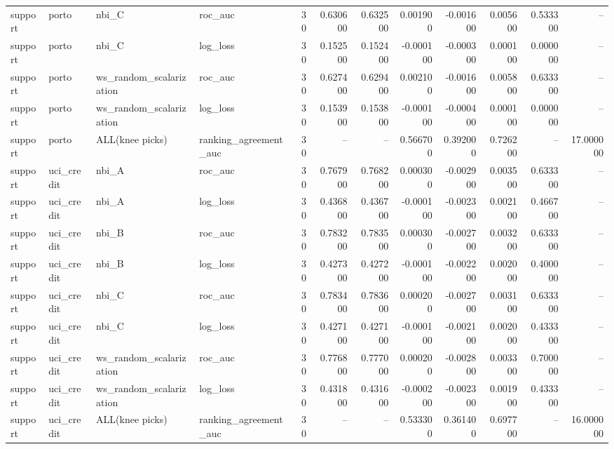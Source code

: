 \begin{landscape}
\begin{longtable}{llllrrrrrrrr}
support & porto & nbi\_C & roc\_auc & 30 & 0.630600 & 0.632500 & 0.001900 & -0.001600 & 0.005600 & 0.533300 & -- \\
support & porto & nbi\_C & log\_loss & 30 & 0.152500 & 0.152400 & -0.000100 & -0.000300 & 0.000100 & 0.000000 & -- \\
support & porto & ws\_random\_scalarization & roc\_auc & 30 & 0.627400 & 0.629400 & 0.002100 & -0.001600 & 0.005800 & 0.633300 & -- \\
support & porto & ws\_random\_scalarization & log\_loss & 30 & 0.153900 & 0.153800 & -0.000100 & -0.000400 & 0.000100 & 0.000000 & -- \\
support & porto & ALL(knee picks) & ranking\_agreement\_auc & 30 & -- & -- & 0.566700 & 0.392000 & 0.726200 & -- & 17.000000 \\
support & uci\_credit & nbi\_A & roc\_auc & 30 & 0.767900 & 0.768200 & 0.000300 & -0.002900 & 0.003500 & 0.633300 & -- \\
support & uci\_credit & nbi\_A & log\_loss & 30 & 0.436800 & 0.436700 & -0.000100 & -0.002300 & 0.002100 & 0.466700 & -- \\
support & uci\_credit & nbi\_B & roc\_auc & 30 & 0.783200 & 0.783500 & 0.000300 & -0.002700 & 0.003200 & 0.633300 & -- \\
support & uci\_credit & nbi\_B & log\_loss & 30 & 0.427300 & 0.427200 & -0.000100 & -0.002200 & 0.002000 & 0.400000 & -- \\
support & uci\_credit & nbi\_C & roc\_auc & 30 & 0.783400 & 0.783600 & 0.000200 & -0.002700 & 0.003100 & 0.633300 & -- \\
support & uci\_credit & nbi\_C & log\_loss & 30 & 0.427100 & 0.427100 & -0.000100 & -0.002100 & 0.002000 & 0.433300 & -- \\
support & uci\_credit & ws\_random\_scalarization & roc\_auc & 30 & 0.776800 & 0.777000 & 0.000200 & -0.002800 & 0.003300 & 0.700000 & -- \\
support & uci\_credit & ws\_random\_scalarization & log\_loss & 30 & 0.431800 & 0.431600 & -0.000200 & -0.002300 & 0.001900 & 0.433300 & -- \\
support & uci\_credit & ALL(knee picks) & ranking\_agreement\_auc & 30 & -- & -- & 0.533300 & 0.361400 & 0.697700 & -- & 16.000000 \\
\end{longtable}\endgroup

\end{landscape}
